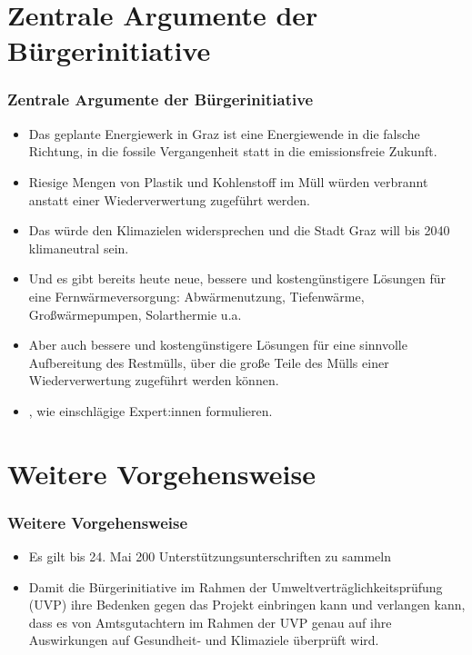 \documentclass[8pt]{beamer}
\begin{document}
	\section{Zentrale Argumente der Bürgerinitiative}
	\begin{frame}[t]
		\frametitle{Zentrale Argumente der Bürgerinitiative} 
		\begin{itemize}
			\item Das geplante Energiewerk in Graz ist eine Energiewende in die falsche Richtung, in die fossile Vergangenheit statt in die emissionsfreie Zukunft. 
			\item Riesige Mengen von Plastik und Kohlenstoff im Müll würden verbrannt anstatt einer Wiederverwertung zugeführt werden. 		
			\item Das würde den Klimazielen widersprechen und die Stadt Graz will bis 2040 klimaneutral sein.
			\item Und es gibt bereits heute neue, bessere und kostengünstigere Lösungen für eine Fernwärme­versorgung: Abwärmenutzung, Tiefenwärme, Großwärmepumpen, Solarthermie u.a.
			\item Aber auch bessere und kostengünstigere Lösungen für eine sinnvolle Aufbereitung des Restmülls, über die große Teile des Mülls einer Wiederverwertung zugeführt werden können. 
			\item {}, wie einschlägige Expert:innen formulieren. 			
  		\end{itemize}
	\end{frame}
	
	
	\section{Weitere Vorgehensweise}
	\begin{frame}[t]
		\frametitle{Weitere Vorgehensweise} 
		\begin{itemize}
			\item Es gilt bis 24. Mai 200 Unterstützungsunterschriften zu sammeln
		    \item Damit die Bürgerinitiative im Rahmen der Umweltverträglichkeitsprüfung (UVP) ihre Bedenken gegen das Projekt einbringen kann und verlangen kann, dass es von Amtsgutachtern im Rahmen der UVP genau auf ihre Auswirkungen auf Gesundheit- und Klimaziele überprüft wird.
  		\end{itemize}
	\end{frame}
\end{document}
